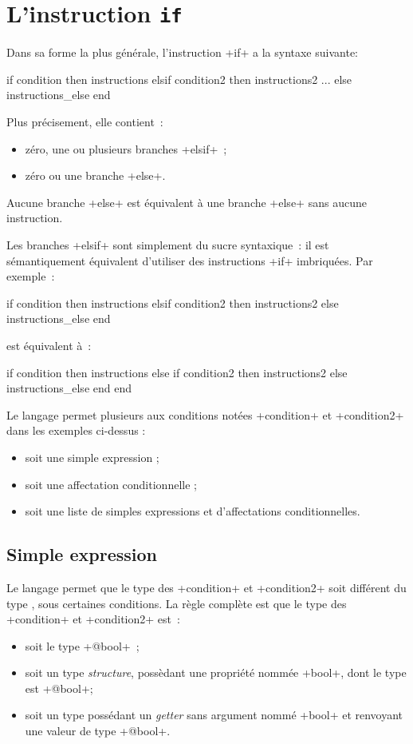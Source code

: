 \section{L'instruction \texttt{if}}


Dans sa forme la plus générale, l'instruction \ggsq+if+ a la syntaxe suivante:

\begin{galgas4box}
if condition then
  instructions
elsif condition2 then
  instructions2
...
else
  instructions_else
end
\end{galgas4box}


Plus précisement, elle contient~:
\begin{itemize}
\item zéro, une ou plusieurs branches \ggsq+elsif+~;
\item zéro ou une branche \ggsq+else+.
\end{itemize}


Aucune branche \ggsq+else+ est équivalent à une branche \ggsq+else+ sans aucune instruction.


Les branches \ggsq+elsif+ sont simplement du sucre syntaxique~: il est sémantiquement équivalent d'utiliser des instructions \ggsq+if+ imbriquées. Par exemple~:
\begin{galgas4}
if condition then
  instructions
elsif condition2 then
  instructions2
else
  instructions_else
end
\end{galgas4}

est équivalent à~:
\begin{galgas4}
if condition then
  instructions
else
  if condition2 then
    instructions2
  else
    instructions_else
  end
end
\end{galgas4}

Le langage permet plusieurs aux conditions notées \ggsq+condition+ et \ggsq+condition2+ dans les exemples ci-dessus :
\begin{itemize}
  \item soit une simple expression ;
  \item soit une affectation conditionnelle ;
  \item soit une liste de simples expressions et d'affectations conditionnelles.
\end{itemize}


\subsection{Simple expression}
Le langage permet que le type des \ggsq+condition+ et \ggsq+condition2+ soit différent du type , sous certaines conditions. La règle complète est que le type des \ggsq+condition+ et \ggsq+condition2+ est~:
\begin{itemize}
\item soit le type \ggsq+@bool+~;
\item soit un type \emph{structure}, possèdant une propriété nommée \ggsq+bool+, dont le type est \ggsq+@bool+;
\item soit un type possédant un \emph{getter} sans argument nommé \ggsq+bool+ et renvoyant une valeur de type \ggsq+@bool+.
\end{itemize}

